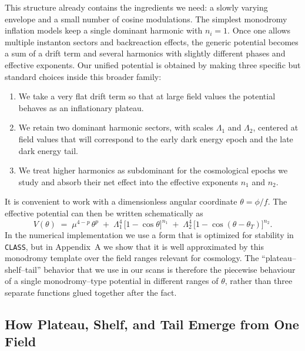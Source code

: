\documentclass[a4paper,11pt]{article}
\begin{document}
This structure already contains the ingredients we need: a slowly varying envelope and a small number of cosine modulations. The simplest monodromy inflation models keep a single dominant harmonic with $n_i = 1$. Once one allows multiple instanton sectors and backreaction effects, the generic potential becomes a sum of a drift term and several harmonics with slightly different phases and effective exponents. Our unified potential is obtained by making three specific but standard choices inside this broader family:
\begin{enumerate}
    \item We take a very flat drift term so that at large field values the potential behaves as an inflationary plateau.
    \item We retain two dominant harmonic sectors, with scales $\Lambda_1$ and $\Lambda_2$, centered at field values that will correspond to the early dark energy epoch and the late dark energy tail.
    \item We treat higher harmonics as subdominant for the cosmological epochs we study and absorb their net effect into the effective exponents $n_1$ and $n_2$.
\end{enumerate}

It is convenient to work with a dimensionless angular coordinate $\theta = \phi/f$. The effective potential can then be written schematically as
\begin{equation}
    V(\theta) \;=\; \mu^{4-p}\,\theta^{p}
    \;+\; \Lambda_1^4\,\Big[1 - \cos\theta\Big]^{n_1}
    \;+\; \Lambda_2^4\,\Big[1 - \cos(\theta - \theta_T)\Big]^{n_2}.
    \label{eq:ridder_monodromy_template}
\end{equation}
In the numerical implementation we use a form that is optimized for stability in \texttt{CLASS}, but in Appendix~A we show that it is well approximated by this monodromy template over the field ranges relevant for cosmology. The ``plateau–shelf–tail'' behavior that we use in our scans is therefore the piecewise behaviour of a single monodromy–type potential in different ranges of $\theta$, rather than three separate functions glued together after the fact.


\subsection{How Plateau, Shelf, and Tail Emerge from One Field}
\end{document}
